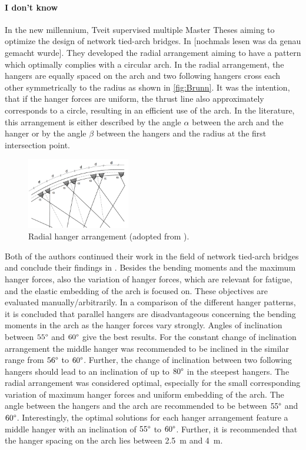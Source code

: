 \paragraph*{I don't know}
In the new millennium, Tveit supervised multiple Master Theses aiming to optimize the design of network tied-arch bridges. In \cite{BrunnSchanack} [nochmals lesen was da genau gemacht wurde]. They developed the radial arrangement aiming to have a pattern which optimally complies with a circular arch. In the radial arrangement, the hangers are equally spaced on the arch and two following hangers cross each other symmetrically to the radius as shown in \autoref{fig:Brunn}. It was the intention, that if the hanger forces are uniform, the thrust line also approximately corresponds to a circle, resulting in an efficient use of the arch. In the literature, this arrangement is either described by the angle $\alpha$ between the arch and the hanger or by the angle $\beta$ between the hangers and the radius at the first intersection point.

\begin{figure}[H]
\centering
\includegraphics[width=0.4\textwidth]{Pictures/RadialArrangement.PNG}
\caption{Radial hanger arrangement (adopted from \cite{BrunnSchanack2}).}
\label{fig:Brunn}
\end{figure}

Both of the authors continued their work in the field of network tied-arch bridges and conclude their findings in \cite{BrunnSchanack2}. Besides the bending moments and the maximum hanger forces, also the variation of hanger forces, which are relevant for fatigue, and the elastic embedding of the arch is focused on. These objectives are evaluated manually/arbitrarily. In a comparison of the different hanger patterns, it is concluded that parallel hangers are disadvantageous concerning the bending moments in the arch as the hanger forces vary strongly. Angles of inclination between $55\degree$ and $60\degree$ give the best results. For the constant change of inclination arrangement the middle hanger was recommended to be inclined in the similar range from $56\degree$ to $60\degree$. Further, the change of inclination between two following hangers should lead to an inclination of up to $80\degree$ in the steepest hangers. The radial arrangement was considered optimal, especially for the small corresponding variation of maximum hanger forces and uniform embedding of the arch. The angle between the hangers and the arch are recommended to be between $55\degree$ and $60\degree$. Interestingly, the optimal solutions for each hanger arrangement feature a middle hanger with an inclination of $55\degree$ to $60\degree$. Further, it is recommended that the hanger spacing on the arch lies between \SI{2.5}{m} and \SI{4}{m}.

